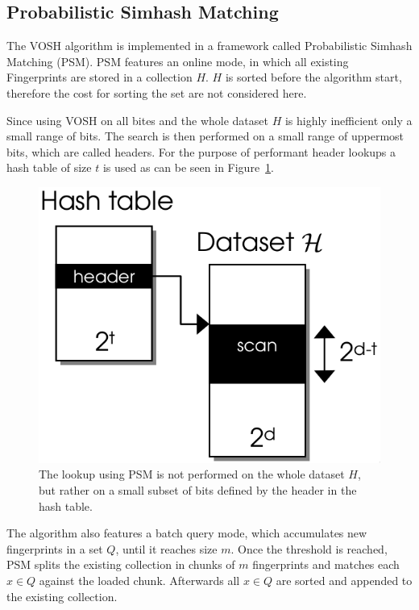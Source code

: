 \documentclass[12pt,a4paper,DIV=calc]{scrartcl}
\begin{document}
\subsection{Probabilistic Simhash Matching}

The VOSH algorithm is implemented in a framework called Probabilistic Simhash Matching (PSM).
PSM features an online mode, in which all existing Fingerprints are stored in a collection $H$.
$H$ is sorted before the algorithm start, therefore the cost for sorting the set are not considered here.

Since using VOSH on all bites and the whole dataset $H$ is highly inefficient only a small range of bits.
The search is then performed on a small range of uppermost bits, which are called headers.
For the purpose of performant header lookups a hash table of size $t$ is used as can be seen in Figure~\ref{fig:vosh-lookup}.

\begin{figure}[h]
    \includegraphics[scale=0.33]{./gfx/vosh-online.png}
    \centering
    \caption{The lookup using PSM is not performed on the whole dataset $H$, but rather on a small subset of bits defined by the header in the hash table.}\label{fig:vosh-lookup}
\end{figure}


The algorithm also features a batch query mode, which accumulates new fingerprints in a set $Q$, until it reaches size $m$.
Once the threshold is reached, PSM splits the existing collection in chunks of $m$ fingerprints and matches each $x \in Q$ against the loaded chunk.
Afterwards all $x \in Q$ are sorted and appended to the existing collection.
\end{document}
